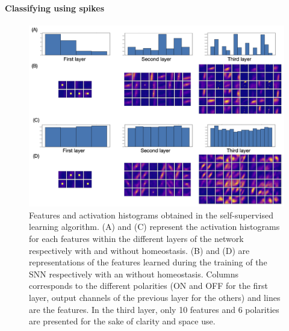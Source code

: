 \documentclass[12pt]{article}
\begin{document}
\paragraph*{Classifying using spikes}
\begin{figure}
\centering
\includegraphics[width=.9\linewidth]{layerz.png}
\caption
{Features and activation histograms obtained in the self-supervised learning algorithm. (A) and (C) represent the activation histograms for each features within the different layers of the network respectively with and without homeostasis. (B) and (D) are representations of the features learned during the training of the SNN respectively with an without homeostasis. Columns corresponds to the different polarities (ON and OFF for the first layer, output channels of the previous layer for the others) and lines are the features. In the third layer, only 10 features and 6 polarities are presented for the sake of clarity and space use.
\label{fig:fig2}
}
\end{figure}
\end{document}
